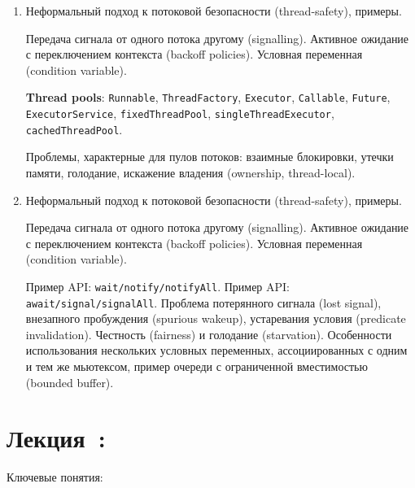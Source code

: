 \documentclass[a4paper, 12pt]{extarticle}
\newcommand{\threadSafetySimple}{Неформальный подход к потоковой безопасности (thread-safety), примеры.}
\begin{document}
\begin{enumerate}[\thesection .1]

	\item \threadSafetySimple 

	Передача сигнала от одного потока другому (signalling). Активное ожидание с переключением контекста (backoff policies).
	Условная переменная (condition variable).

	\textbf{Thread pools}: \texttt{Runnable}, \texttt{ThreadFactory}, \texttt{Executor}, \texttt{Callable}, \texttt{Future}, \texttt{ExecutorService}, \texttt{fixedThreadPool}, \texttt{singleThreadExecutor}, \texttt{cachedThreadPool}.

	Проблемы, характерные для пулов потоков: взаимные блокировки, утечки памяти, голодание, искажение владения (ownership, thread-local).

	\item \threadSafetySimple 

	Передача сигнала от одного потока другому (signalling). Активное ожидание с переключением контекста (backoff policies).
	Условная переменная (condition variable).

	Пример API: \texttt{wait/notify/notifyAll}. Пример API: \texttt{await/signal/signalAll}.
	Проблема потерянного сигнала (lost signal), внезапного пробуждения (spurious wakeup), устаревания условия (predicate invalidation). Честность (fairness) и голодание (starvation). Особенности использования нескольких условных переменных, ассоциированных с одним и тем же мьютексом, пример очереди с ограниченной вместимостью (bounded buffer).

\end{enumerate}


\section{Лекция~\syncPrimitivesNum: \syncPrimitivesTopic}

Ключевые понятия: \syncPrimitivesKey
\end{document}

